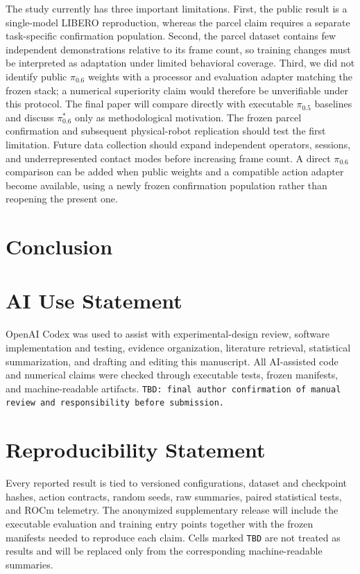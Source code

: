 \documentclass[11pt]{article}
\begin{document}
The study currently has three important limitations. First, the public result is
a single-model LIBERO reproduction, whereas the parcel claim requires a separate
task-specific confirmation population. Second, the parcel dataset contains few
independent demonstrations relative to its frame count, so training changes must
be interpreted as adaptation under limited behavioral coverage. Third, we did not
identify public $\pi_{0.6}$ weights with a processor and evaluation adapter
matching the frozen stack; a numerical superiority claim would therefore be
unverifiable under this protocol. The final paper will compare directly with
executable $\pi_{0.5}$ baselines and discuss $\pi_{0.6}^{*}$ only as
methodological motivation. The frozen parcel confirmation and subsequent
physical-robot replication should test the first limitation. Future data
collection should expand independent operators, sessions, and underrepresented
contact modes before increasing frame count. A direct $\pi_{0.6}$ comparison can
be added when public weights and a compatible action adapter become available,
using a newly frozen confirmation population rather than reopening the present
one.

\section{Conclusion}


\section*{AI Use Statement}

OpenAI Codex was used to assist with experimental-design review, software
implementation and testing, evidence organization, literature retrieval,
statistical summarization, and drafting and editing this manuscript. All
AI-assisted code and numerical claims were checked through executable tests,
frozen manifests, and machine-readable artifacts. \texttt{TBD: final author
confirmation of manual review and responsibility before submission.}

\section*{Reproducibility Statement}

Every reported result is tied to versioned configurations, dataset and
checkpoint hashes, action contracts, random seeds, raw summaries, paired
statistical tests, and ROCm telemetry. The anonymized supplementary release will
include the executable evaluation and training entry points together with the
frozen manifests needed to reproduce each claim. Cells marked \texttt{TBD} are
not treated as results and will be replaced only from the corresponding
machine-readable summaries.



\end{document}

